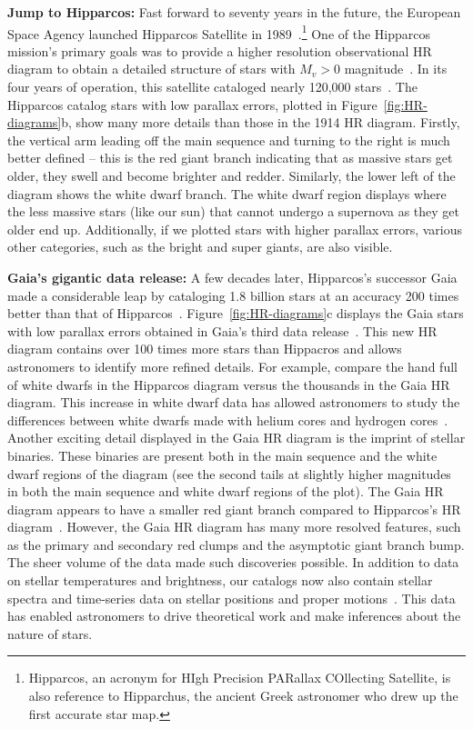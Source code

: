 \textbf{Jump to Hipparcos:}
Fast forward to seventy years in the future, the European Space Agency launched Hipparcos Satellite in 1989~\cite{HIPPARCOS}.\footnote{Hipparcos, an acronym for HIgh Precision PARallax COllecting Satellite, is also reference to Hipparchus, the ancient Greek astronomer who drew up the first accurate star map.}
One of the Hipparcos mission's primary goals was to provide a higher resolution observational HR diagram to obtain a detailed structure of stars with $M_v>0$ magnitude~\cite{HIPPARCOS}. 
In its four years of operation, this satellite cataloged nearly 120,000 stars~\cite{HIPPARCOS}. 
The Hipparcos catalog stars with low parallax errors, plotted in Figure~\ref{fig:HR-diagrams}b, show many more details than those in the 1914 HR diagram. 
Firstly, the vertical arm leading off the main sequence and turning to the right is much better defined -- this is the red giant branch indicating that as massive stars get older, they swell and become brighter and redder.
Similarly, the lower left of the diagram shows the white dwarf branch. 
The white dwarf region displays where the less massive stars (like our sun) that cannot undergo a supernova as they get older end up. 
Additionally, if we plotted stars with higher parallax errors, various other categories, such as the bright and super giants, are also visible.


\textbf{Gaia's gigantic data release:}
A few decades later, Hipparcos's successor Gaia made a considerable leap by cataloging 1.8 billion stars at an accuracy 200 times better than that of Hipparcos~\cite{GaiaMission, GaiaEDR3}. 
Figure~\ref{fig:HR-diagrams}c displays the Gaia stars with low parallax errors obtained in Gaia's third data release~\cite{GaiaEDR3}. 
This new HR diagram contains over 100 times more stars than Hippacros and allows astronomers to identify more refined details. 
For example, compare the hand full of white dwarfs in the Hipparcos diagram versus the thousands in the Gaia HR diagram.
This increase in white dwarf data has allowed astronomers to study the differences between white dwarfs made with helium cores and hydrogen cores~\cite{GaiaCollaboration:2018:AA}. 
Another exciting detail displayed in the Gaia HR diagram is the imprint of stellar binaries.
These binaries are present both in the main sequence and the white dwarf regions of the diagram (see the second tails at slightly higher magnitudes in both the main sequence and white dwarf regions of the plot).
The Gaia HR diagram appears to have a smaller red giant branch compared to Hipparcos's HR diagram~\cite{GaiaCollaboration:2018:AA}. 
However, the Gaia HR diagram has many more resolved features, such as the primary and secondary red clumps and the asymptotic giant branch bump. 
The sheer volume of the data made such discoveries possible. 
In addition to data on stellar temperatures and brightness, our catalogs now also contain stellar spectra and time-series data on stellar positions and proper motions~\cite{GaiaEDR3}.
This data has enabled astronomers to drive theoretical work and make inferences about the nature of stars.

